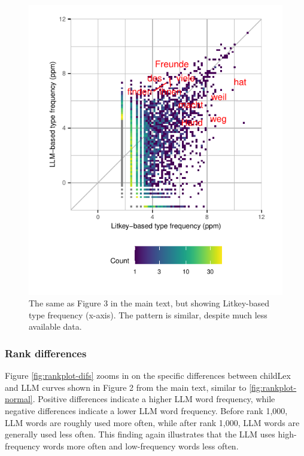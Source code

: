 \documentclass[doc, a4paper]{apa7}
\begin{document}
\begin{figure}[!htbp]
  \centerline{
    \includegraphics[scale=1.4]{figures/litkey.pdf}}
    \caption{The same as Figure 3 in the main text, but showing Litkey-based type frequency (x-axis). The pattern is similar, despite much less available data. }
    \label{fig:corlitkey}
\end{figure}

\clearpage


\subsubsection{Rank differences}

Figure \ref{fig:rankplot-difs} zooms in on the specific differences between childLex and LLM curves shown in Figure 2 from the main text, similar to \ref{fig:rankplot-normal}. Positive differences indicate a higher LLM word frequency, while negative differences indicate a lower LLM word frequency. Before rank 1,000, LLM words are roughly used more often, while after rank 1,000, LLM words are generally used less often. This finding again illustrates that the LLM uses high-frequency words more often and low-frequency words less often.  
\end{document}
